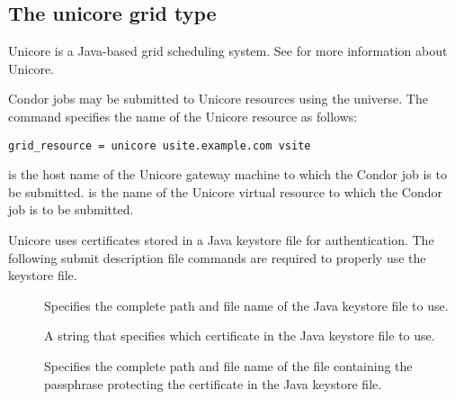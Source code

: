 
\subsection{\label{sec:Unicore}The unicore grid type }

Unicore is a Java-based grid scheduling system.
See  for more information about Unicore.

Condor jobs may be submitted to
Unicore resources using the  universe.
The  command specifies the name of the
Unicore resource as follows:
\begin{verbatim}
grid_resource = unicore usite.example.com vsite
\end{verbatim}
 is the host name of the Unicore gateway
machine to which the Condor job is to be submitted.
 is the name of the Unicore virtual resource to which
the Condor job is to be submitted.

Unicore uses certificates stored in a Java keystore file for
authentication. 
The following submit description file commands
are required to properly use the keystore file.

\begin{description}
\item[] 
  Specifies the complete path and file name of the Java keystore file to use. 
\item[] 
  A string that specifies which certificate in the
  Java keystore file to use. 
\item[]
  Specifies the complete path and file name of the 
  file containing the passphrase protecting the certificate in the  
  Java keystore file.
\end{description}
